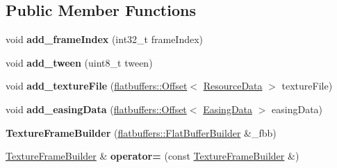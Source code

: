 \subsection*{Public Member Functions}
\begin{DoxyCompactItemize}
\item 
\mbox{\label{structflatbuffers_1_1TextureFrameBuilder_a83f3b133ff9a17ab456104d33a8e8110}} 
void {\bfseries add\+\_\+frame\+Index} (int32\+\_\+t frame\+Index)
\item 
\mbox{\label{structflatbuffers_1_1TextureFrameBuilder_a345a373fd03ad7f14369e692b888d53f}} 
void {\bfseries add\+\_\+tween} (uint8\+\_\+t tween)
\item 
\mbox{\label{structflatbuffers_1_1TextureFrameBuilder_a023f96a19e0b1d480e40868ab6450659}} 
void {\bfseries add\+\_\+texture\+File} (\hyperlink{structflatbuffers_1_1Offset}{flatbuffers\+::\+Offset}$<$ \hyperlink{structflatbuffers_1_1ResourceData}{Resource\+Data} $>$ texture\+File)
\item 
\mbox{\label{structflatbuffers_1_1TextureFrameBuilder_aa0c2de35768aca74c8da18b457f60594}} 
void {\bfseries add\+\_\+easing\+Data} (\hyperlink{structflatbuffers_1_1Offset}{flatbuffers\+::\+Offset}$<$ \hyperlink{structflatbuffers_1_1EasingData}{Easing\+Data} $>$ easing\+Data)
\item 
\mbox{\label{structflatbuffers_1_1TextureFrameBuilder_a7a61c26c480bdfe34d8252737ea9f01b}} 
{\bfseries Texture\+Frame\+Builder} (\hyperlink{classflatbuffers_1_1FlatBufferBuilder}{flatbuffers\+::\+Flat\+Buffer\+Builder} \&\+\_\+fbb)
\item 
\mbox{\label{structflatbuffers_1_1TextureFrameBuilder_a817806a6def203d60e02d165a1d93383}} 
\hyperlink{structflatbuffers_1_1TextureFrameBuilder}{Texture\+Frame\+Builder} \& {\bfseries operator=} (const \hyperlink{structflatbuffers_1_1TextureFrameBuilder}{Texture\+Frame\+Builder} \&)
\item 
\mbox{\label{structflatbuffers_1_1TextureFrameBuilder_aa0eb48b45d9cf909145aea208299e24c}} 

\end{DoxyCompactItemize}
